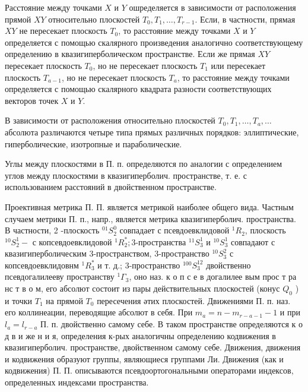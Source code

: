 \documentclass[10pt]{article}
\begin{document}
Расстояние между точками $X$ и $Y$ ошределяется в зависимости от расположения прямой $X Y$ относительно плоскостей $T_{0}, T_{1}, \ldots, T_{r-1}$. Если, в частности, прямая $X Y$ не пересекает плоскость $T_{0}$, то расстояние между точками $X$ и $Y$ определяется с помощью скалярного произведения аналогично соответствующему определению в квазигиперболическом пространстве. Если же прямая $X Y$ пересекает плоскость $T_{0}$, но не пересекает плоскость $T_{1}$ или пересекает плоскость $T_{a-1}$, но не пересекает плоскость $T_{a}$, то расстояние между точками определяется с помощью скалярного квадрата разности соответствующих векторов точек $X$ и $Y$.



В зависимости от расположения относительно плоскостей $T_{0}, T_{1}, \ldots, T_{a}, \ldots$ абсолюта различаются четыре типа прямых различных порядков: эллиптические, гиперболические, изотропные и параболические.



Углы между плоскостями в П. п. определяются по аналогии с определением углов между плоскостями в квазигиперболич. пространстве, т. е. с использованием расстояний в двойственном пространстве.



Проективная метрика П. П. является метрикой наиболее общего вида. Частным случаем метрики П. п., напр., является метрика квазигиперболич. пространства. В частности, 2 -плоскость ${ }^{01} S_{2}^{0}$ совпадает с псевдоевклидовой ${ }^{1} R_{2}$, плоскость ${ }^{10} S_{2}^{1}-$ с копсевдоевклидовой ${ }^{1} R_{2}^{*} ; 3$-пространства ${ }^{11} S_{3}^{1}$ и ${ }^{10} S_{3}^{1}$ совпадают с квазигиперболическим 3-пространством, 3-пространство ${ }^{10} S_{3}^{2}$ с копсевдоевклидовнм ${ }^{1} R_{3}^{*}$ и т. д.; 3-пространство ${ }^{100} S_{3}^{12}$ двойственно псевдогалилееву пространству ${ }^{1} \Gamma_{3}$, оно наз. к о п с е в догалилее вым прос т ра нс т в о м, его абсолют состоит из пары действительных плоскостей (конус $Q_{0}$ ) и точки $T_{1}$ на прямой $T_{0}$ пересечения әтих плоскостей. Движениями П. п. наз. его коллинеации, переводящие абсолют в себя. При $m_{a}=n-m_{r-a-1}-1$ и при $l_{a}=l_{r-a}$ П. п. двойственно самому себе. В таком пространстве определяются к о д в и же н и я, определения к-рых аналогичны определению кодвижения в квазигиперболич. пространстве, двойственном самому себе. Движения, движения и кодвижения образуют группы, являющиеся группами Ли. Движения (как и кодвижения) П. П. описываются псевдоортогональными операторами индексов, определенных индексами пространства.
\end{document}
